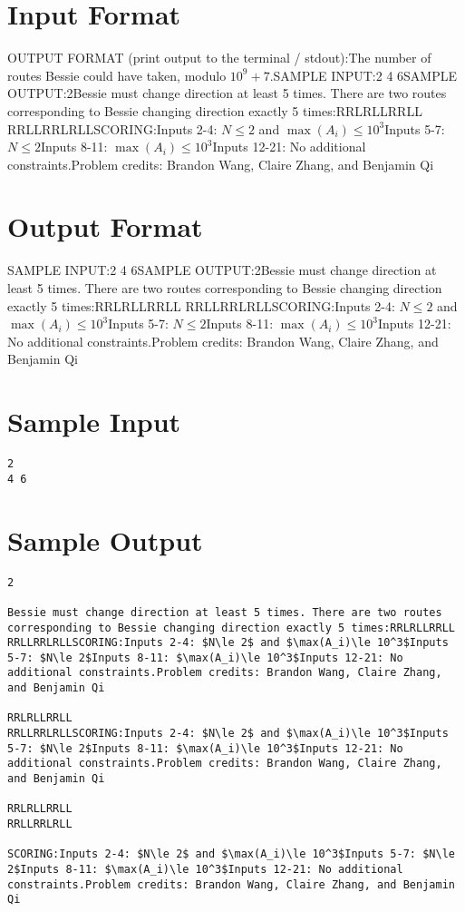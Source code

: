 \documentclass[12pt]{article}
\begin{document}
\section*{Input Format}
OUTPUT FORMAT (print output to the terminal / stdout):The number of routes Bessie could have taken, modulo $10^9+7$.SAMPLE INPUT:2
4 6SAMPLE OUTPUT:2Bessie must change direction at least 5 times. There are two routes 
corresponding to Bessie changing direction exactly 5 times:RRLRLLRRLL
RRLLRRLRLLSCORING:Inputs 2-4: $N\le 2$ and $\max(A_i)\le 10^3$Inputs 5-7: $N\le 2$Inputs 8-11: $\max(A_i)\le 10^3$Inputs 12-21: No additional constraints.Problem credits: Brandon Wang, Claire Zhang, and Benjamin Qi

\section*{Output Format}
SAMPLE INPUT:2
4 6SAMPLE OUTPUT:2Bessie must change direction at least 5 times. There are two routes 
corresponding to Bessie changing direction exactly 5 times:RRLRLLRRLL
RRLLRRLRLLSCORING:Inputs 2-4: $N\le 2$ and $\max(A_i)\le 10^3$Inputs 5-7: $N\le 2$Inputs 8-11: $\max(A_i)\le 10^3$Inputs 12-21: No additional constraints.Problem credits: Brandon Wang, Claire Zhang, and Benjamin Qi

\section*{Sample Input}
\begin{verbatim}
2
4 6
\end{verbatim}

\section*{Sample Output}
\begin{verbatim}
2

Bessie must change direction at least 5 times. There are two routes 
corresponding to Bessie changing direction exactly 5 times:RRLRLLRRLL
RRLLRRLRLLSCORING:Inputs 2-4: $N\le 2$ and $\max(A_i)\le 10^3$Inputs 5-7: $N\le 2$Inputs 8-11: $\max(A_i)\le 10^3$Inputs 12-21: No additional constraints.Problem credits: Brandon Wang, Claire Zhang, and Benjamin Qi

RRLRLLRRLL
RRLLRRLRLLSCORING:Inputs 2-4: $N\le 2$ and $\max(A_i)\le 10^3$Inputs 5-7: $N\le 2$Inputs 8-11: $\max(A_i)\le 10^3$Inputs 12-21: No additional constraints.Problem credits: Brandon Wang, Claire Zhang, and Benjamin Qi

RRLRLLRRLL
RRLLRRLRLL

SCORING:Inputs 2-4: $N\le 2$ and $\max(A_i)\le 10^3$Inputs 5-7: $N\le 2$Inputs 8-11: $\max(A_i)\le 10^3$Inputs 12-21: No additional constraints.Problem credits: Brandon Wang, Claire Zhang, and Benjamin Qi
\end{verbatim}
\end{document}
